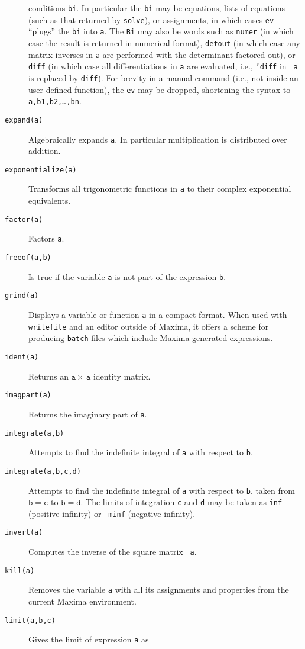 \documentclass[a4paper,12pt]{article}
\begin{document}
\begin{description}
  conditions {\tt bi}.  In particular the {\tt bi} may be equations,
  lists of equations (such as that returned by {\tt solve}), or
  assignments, in which cases {\tt ev} ``plugs'' the {\tt bi} into
  {\tt a}.  The {\tt Bi} may also be words such as {\tt numer} (in
  which case the result is returned in numerical format), {\tt detout}
  (in which case any matrix inverses in {\tt a} are performed with the
  determinant factored out), or {\tt diff} (in which case all
  differentiations in {\tt a} are evaluated, i.e., {\tt 'diff} in {\tt
    a} is replaced by {\tt diff}).  For brevity in a manual command
  (i.e., not inside an user-defined function), the {\tt ev} may be
  dropped, shortening the syntax to {\tt a,b1,b2,\ldots,bn}.
\item[{\tt expand(a)}] Algebraically expands {\tt a}.  In particular
  multiplication is distributed over addition.
\item[{\tt exponentialize(a)}] Transforms all trigonometric functions
  in {\tt a} to their complex exponential equivalents.
\item[{\tt factor(a)}] Factors {\tt a}.
\item[{\tt freeof(a,b)}] Is true if the variable {\tt a} is not part
  of the expression {\tt b}.
\item[{\tt grind(a)}] Displays a variable or function {\tt a} in a
  compact format.  When used with {\tt writefile} and an editor
  outside of Maxima, it offers a scheme for producing {\tt batch}
  files which include Maxima-generated expressions.
\item[{\tt ident(a)}] Returns an $\mathtt{a} \times\, \mathtt{a}$
  identity matrix.
\item[{\tt imagpart(a)}] Returns the imaginary part of {\tt a}.
\item[{\tt integrate(a,b)}] Attempts to find the indefinite integral
  of {\tt a} with respect to {\tt b}.
\item[{\tt integrate(a,b,c,d)}] Attempts to find the indefinite
  integral of {\tt a} with respect to {\tt b}. taken from
  $\mathtt{b=c}$ to $\mathtt{b=d}$.  The limits of integration {\tt c}
  and {\tt d} may be taken as {\tt inf} (positive infinity) or {\tt
    minf} (negative infinity).
\item[{\tt invert(a)}] Computes the inverse of the square matrix {\tt
    a}.
\item[{\tt kill(a)}] Removes the variable {\tt a} with all its
  assignments and properties from the current Maxima environment.
\item[{\tt limit(a,b,c)}] Gives the limit of expression {\tt a} as

\end{description}
\end{document}
